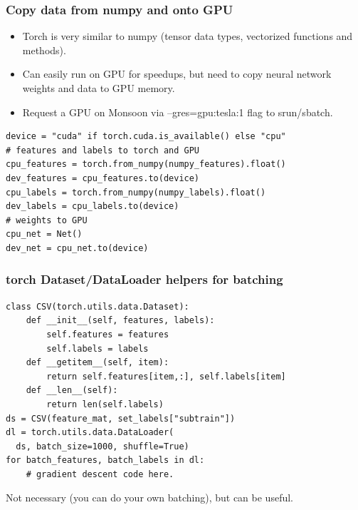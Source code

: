 \documentclass{beamer}
\begin{document}
\begin{frame}[fragile]
  \frametitle{Copy data from numpy and onto GPU}
  \begin{itemize}
  \item Torch is very similar to numpy (tensor data types, vectorized
    functions and methods).
  \item Can easily run on GPU for speedups, but need to copy neural network weights and data to GPU memory.
  \item Request a GPU on Monsoon via --gres=gpu:tesla:1 flag to
    srun/sbatch.
  \end{itemize}
\begin{verbatim}
device = "cuda" if torch.cuda.is_available() else "cpu"
# features and labels to torch and GPU
cpu_features = torch.from_numpy(numpy_features).float()
dev_features = cpu_features.to(device)
cpu_labels = torch.from_numpy(numpy_labels).float()
dev_labels = cpu_labels.to(device)
# weights to GPU
cpu_net = Net()
dev_net = cpu_net.to(device)
\end{verbatim}
\end{frame}

\begin{frame}[fragile]
  \frametitle{torch Dataset/DataLoader helpers for batching}
\begin{verbatim}
class CSV(torch.utils.data.Dataset):
    def __init__(self, features, labels):
        self.features = features
        self.labels = labels
    def __getitem__(self, item):
        return self.features[item,:], self.labels[item]
    def __len__(self):
        return len(self.labels)
ds = CSV(feature_mat, set_labels["subtrain"])
dl = torch.utils.data.DataLoader(
  ds, batch_size=1000, shuffle=True)
for batch_features, batch_labels in dl:
    # gradient descent code here.
\end{verbatim}

Not necessary (you can do your own batching), but can be useful.

\end{frame}
\end{document}

